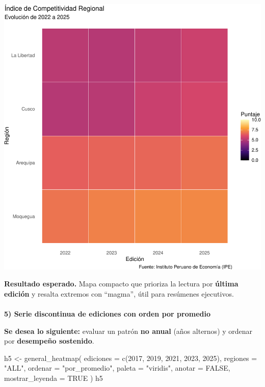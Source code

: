 \documentclass[
  11pt,
  letterpaper,
  DIV=11,
  numbers=noendperiod]{scrartcl}
\makeatletter
\let\oldparagraph\paragraph
\renewcommand{\paragraph}{
    \@ifstar
      \xxxParagraphStar
      \xxxParagraphNoStar
  }
\newcommand{\xxxParagraphStar}[1]{\oldparagraph*{#1}\mbox{}}
\newcommand{\xxxParagraphNoStar}[1]{\oldparagraph{#1}\mbox{}}
\newenvironment{Shaded}{\begin{snugshade}}{\end{snugshade}}
\newcommand{\AttributeTok}[1]{\textcolor[rgb]{0.40,0.45,0.13}{#1}}
\newcommand{\ConstantTok}[1]{\textcolor[rgb]{0.56,0.35,0.01}{#1}}
\newcommand{\DecValTok}[1]{\textcolor[rgb]{0.68,0.00,0.00}{#1}}
\newcommand{\FunctionTok}[1]{\textcolor[rgb]{0.28,0.35,0.67}{#1}}
\newcommand{\NormalTok}[1]{\textcolor[rgb]{0.00,0.23,0.31}{#1}}
\newcommand{\OtherTok}[1]{\textcolor[rgb]{0.00,0.23,0.31}{#1}}
\newcommand{\StringTok}[1]{\textcolor[rgb]{0.13,0.47,0.30}{#1}}
\makeatother
\begin{document}
\includegraphics{Manual_files/figure-pdf/unnamed-chunk-34-1.pdf}

\textbf{Resultado esperado.} Mapa compacto que prioriza la lectura por
\textbf{última edición} y resalta extremos con ``magma'', útil para
resúmenes ejecutivos.

\paragraph{\texorpdfstring{\textbf{5) Serie discontinua de ediciones con
orden por
promedio}}{5) Serie discontinua de ediciones con orden por promedio}}\label{serie-discontinua-de-ediciones-con-orden-por-promedio}

\textbf{Se desea lo siguiente:} evaluar un patrón \textbf{no anual}
(años alternos) y ordenar por \textbf{desempeño sostenido}.

\begin{Shaded}
\begin{Highlighting}[]
\NormalTok{h5 }\OtherTok{\textless{}{-}} \FunctionTok{general\_heatmap}\NormalTok{(}
  \AttributeTok{ediciones =} \FunctionTok{c}\NormalTok{(}\DecValTok{2017}\NormalTok{, }\DecValTok{2019}\NormalTok{, }\DecValTok{2021}\NormalTok{, }\DecValTok{2023}\NormalTok{, }\DecValTok{2025}\NormalTok{),}
  \AttributeTok{regiones  =} \StringTok{"ALL"}\NormalTok{,}
  \AttributeTok{ordenar   =} \StringTok{"por\_promedio"}\NormalTok{,}
  \AttributeTok{paleta    =} \StringTok{"viridis"}\NormalTok{,}
  \AttributeTok{anotar    =} \ConstantTok{FALSE}\NormalTok{,}
  \AttributeTok{mostrar\_leyenda =} \ConstantTok{TRUE}
\NormalTok{)}
\NormalTok{h5}
\end{Highlighting}
\end{Shaded}
\end{document}
